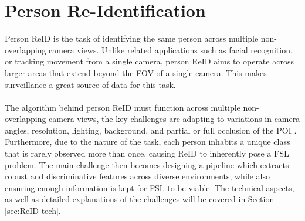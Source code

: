 \section{Person Re-Identification}\label{ReID-prob}
Person \acf{ReID} is the task of identifying the same person across multiple non-overlapping camera views. Unlike related applications such as facial recognition, or tracking movement from a single camera, person \acs{ReID} aims to operate across larger areas that extend beyond the \acf{FOV} of a single camera. This makes surveillance a great source of data for this task.
\\\\
The algorithm behind person \acs{ReID} must function across multiple non-overlapping camera views, the key challenges are adapting to variations in camera angles, resolution, lighting, background, and partial or full occlusion of the \acf{POI} \cite{IntroPReID2023}. Furthermore, due to the nature of the task, each person inhabits a unique class that is rarely observed more than once, causing \acs{ReID} to inherently pose a \acf{FSL} problem. The main challenge then becomes designing a pipeline which extracts robust and discriminative features across diverse environments, while also ensuring enough information is kept for \acs{FSL} to be viable. The technical aspects, as well as detailed explanations of the challenges will be covered in Section \ref{sec:ReID-tech}.

